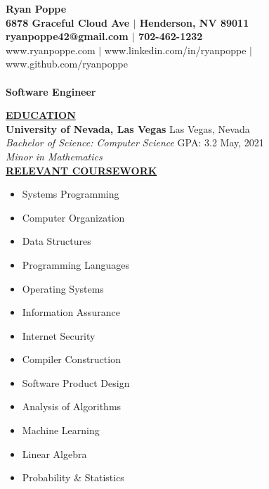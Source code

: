 \documentclass{article}
\begin{document}
\begin{center}
\thispagestyle{empty}
\large \textbf{Ryan Poppe \\}
\large \textbf{6878 Graceful Cloud Ave $\mid$ Henderson, NV 89011 \\}
\large \textbf{ryanpoppe42@gmail.com $\mid$ 702-462-1232 \\}
\small www.ryanpoppe.com $\mid$ www.linkedin.com/in/ryanpoppe $\mid$ www.github.com/ryanpoppe    \\
\hrulefill
\thispagestyle{empty} \\
\large \textbf{Software Engineer \\}
\end{center}


\noindent \textbf{\underline{EDUCATION}} \\
\textbf{University of Nevada, Las Vegas} \hfill Las Vegas, Nevada \\
\textit{Bachelor of Science: Computer Science} \hfill GPA: 3.2 \hfill May, 2021 \\
\textit{Minor in Mathematics} \\


\noindent \textbf{\underline{RELEVANT COURSEWORK}}
\setlength\multicolsep{0pt}
    \begin{multicols}{3}
    \begin{itemize}[noitemsep,nolistsep,leftmargin=*]
        \item Systems Programming
        \item Computer Organization
        \item Data Structures
        \item Programming Languages
        \item Operating Systems
        \item Information Assurance
        \item Internet Security
        \item Compiler Construction
        \item Software Product Design
        \item Analysis of Algorithms
        \item Machine Learning
        \item Linear Algebra
        \item Probability \& Statistics
    \end{itemize}
    \end{multicols}
\end{document}
